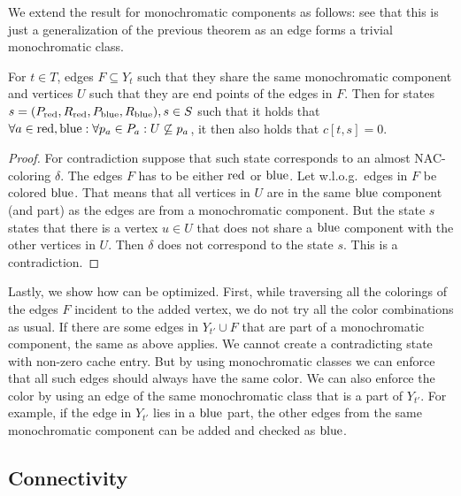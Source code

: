 We extend the result for monochromatic components as follows:
see that this is just a generalization of the previous theorem
as an edge forms a trivial monochromatic class.
%
\begin{theorem}
	For \( t \in T \),
	edges \( F \subseteq Y_t \) such that
	they share the same monochromatic component
	and vertices \( U \) such that they are end points of the edges in \( F \).
	Then for states \( s = (P_{\text{red}}, R_{\text{red}}, P_{\text{blue}}, R_{\text{blue}}), s \in S \)
	such that it holds that
	\( \forall a \in {\text{red}, \text{blue}}: \forall p_a \in P_a : U \not\subseteq p_a \),
	it then also holds that \( c[t, s] = 0 \).
\end{theorem}
%
%
\begin{proof}
	For contradiction suppose that such state corresponds to an almost NAC-coloring \( \delta \).
	The edges \( F \) has to be either \( \text{red} \) or \( \text{blue} \).
	Let w.l.o.g.\ edges in \( F \) be colored \( \text{blue} \).
	That means that all vertices in \( U \) are in the same \( \text{blue} \) component (and part)
	as the edges are from a monochromatic component.
	But the state \( s \) states that there is a vertex \( u \in U \)
	that does not share a \( \text{blue} \) component with the other vertices in \( U \).
	Then \( \delta \) does not correspond to the state \( s \).
	This is a contradiction.
\end{proof}
%

Lastly, we show how \IntroduceVertexWithEdgesNode{} can be optimized.
First, while traversing all the colorings of the edges \( F \) incident to the added vertex,
we do not try all the color combinations as usual. If there are some edges
in \( Y_{t'} \cup F \) that are part of a monochromatic component,
the same as above applies. We cannot create a contradicting state with non-zero
cache entry. But by using monochromatic classes
we can enforce that all such edges should always have the same color.
We can also enforce the color by using an edge of the same monochromatic class
that is a part of \( Y_{t'} \).
For example, if the edge in \( Y_{t'} \) lies in a \( \text{blue} \) part,
the other edges from the same monochromatic component
can be added and checked as \( \text{blue} \).


\subsection{Connectivity}

